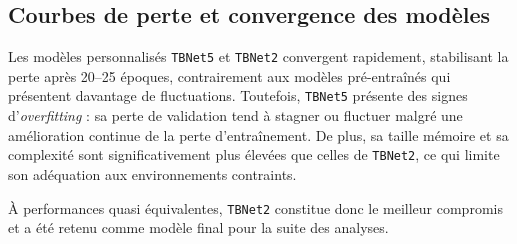 \subsection{Courbes de perte et convergence des modèles}
\label{subsec:loss_curves}

Les modèles personnalisés \texttt{TBNet5} et \texttt{TBNet2} convergent rapidement, stabilisant la perte après 20–25 époques, contrairement aux modèles pré-entraînés qui présentent davantage de fluctuations.
Toutefois, \texttt{TBNet5} présente des signes d’\textit{overfitting} \cite{goodfellow2016deep} : sa perte de validation tend à stagner ou fluctuer malgré une amélioration continue de la perte d’entraînement.
De plus, sa taille mémoire et sa complexité sont significativement plus élevées que celles de \texttt{TBNet2}, ce qui limite son adéquation aux environnements contraints.

À performances quasi équivalentes, \texttt{TBNet2} constitue donc le meilleur compromis et a été retenu comme modèle final pour la suite des analyses.


